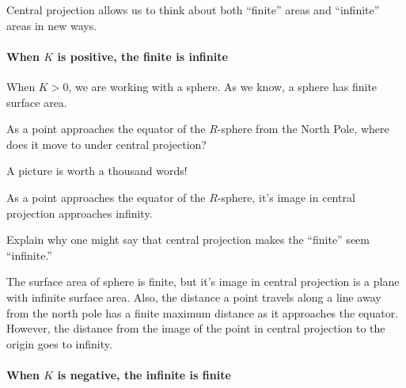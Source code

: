 \documentclass{ximera}
\begin{document}
Central projection allows us to think about both ``finite'' areas and
``infinite'' areas in new ways.

\paragraph{When $K$ is positive, the finite is infinite}

When $K>0$, we are working with a sphere. As we know, a sphere has
finite surface area.

\begin{problem}
  As a point approaches the equator of the $R$-sphere from the North
  Pole, where does it move to under central projection?
  \begin{hint}
    A picture is worth a thousand words!
  \end{hint}
  \begin{freeResponse}
  As a point approaches the equator of the $R$-sphere, it's image in central projection approaches infinity. 
  \end{freeResponse}
\end{problem}

\begin{problem}
  Explain why one might say that central projection makes the
  ``finite'' seem ``infinite.''
    \begin{freeResponse}
    The surface area of sphere is finite, but it's image in central projection is a plane with infinite surface area. Also, the distance a point travels along a line away from the north pole has a finite maximum distance as it approaches the equator. However, the distance from the image of the point in central projection to the origin goes to infinity. 
    \end{freeResponse}
\end{problem}


\paragraph{When $K$ is negative, the infinite is finite}
\end{document}

